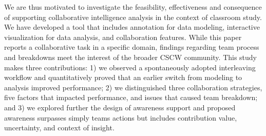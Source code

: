 We are thus motivated to investigate the feasibility, effectiveness and
consequence of supporting collaborative intelligence analysis in the context of
classroom study. We have developed a tool that includes annotation for data
modeling, interactive visualization for data analysis, and collaboration
features. While this paper reports a collaborative task in a specific domain,
findings regarding team process and breakdowns meet the interest of the broader
CSCW community. This study makes three contributions: 1) we observed a
spontaneously adopted interleaving workflow and quantitatively proved that an
earlier switch from modeling to analysis improved performance; 2) we
distinguished three collaboration strategies, five factors that impacted
performance, and issues that caused team breakdown; and 3) we explored further
the design of awareness support and proposed awareness surpasses simply teams
actions but includes contribution value, uncertainty, and context of insight.
